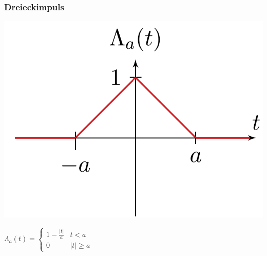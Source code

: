 		\subsubsection{Dreieckimpuls}
			\begin{minipage}{0.2\textwidth}
				\includegraphics[width=\textwidth]{./bilder/funktionen/dreieckF.png}
			\end{minipage}
			\qquad
			\begin{minipage}{0.45\textwidth}
				$\Lambda_{a}(t)=\begin{cases}{1-\frac{|t|}{a}} & {t<a} \\ {0} & {|t| \geq a}\end{cases}$
			\end{minipage}
			\qquad
			\begin{minipage}{0.25\textwidth}						
			\end{minipage}
		
		
